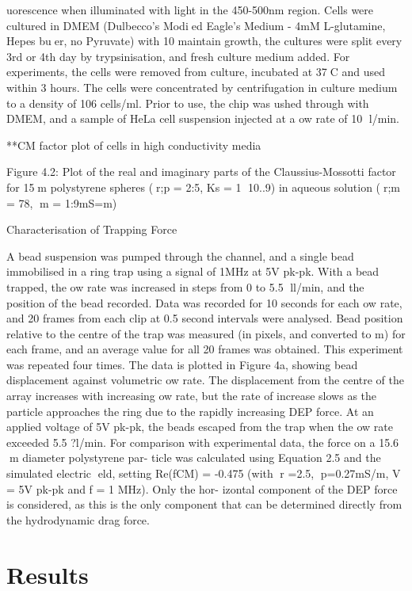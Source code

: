 uorescence when illuminated with light in the 450-500nm region. Cells were cultured
in DMEM (Dulbecco's Modied Eagle's Medium - 4mM L-glutamine, Hepes buer, no
Pyruvate) with 10%
maintain growth, the cultures were split every 3rd or 4th day by trypsinisation, and fresh
culture medium added. For experiments, the cells were removed from culture, incubated
at 37C and used within 3 hours. The cells were concentrated by centrifugation in culture
medium to a density of 106 cells/ml. Prior to use, the chip was 
ushed through with
DMEM, and a sample of HeLa cell suspension injected at a 
ow rate of 10 l/min.


**CM factor plot of cells in high conductivity media

Figure 4.2: Plot of the real and imaginary parts of the Claussius-Mossotti factor for
15m polystyrene spheres (r;p = 2:5, Ks = 1  10..9) in aqueous solution (r;m = 78,
m = 1:9mS=m)

Characterisation of Trapping Force

A bead suspension was pumped through the channel, and a single bead immobilised in
a ring trap using a signal of 1MHz at 5V pk-pk. With a bead trapped, the 
ow rate
was increased in steps from 0 to 5.5 ll/min, and the position of the bead recorded.
Data was recorded for 10 seconds for each 
ow rate, and 20 frames from each clip at
0.5 second intervals were analysed. Bead position relative to the centre of the trap was
measured (in pixels, and converted to m) for each frame, and an average value for all 20
frames was obtained. This experiment was repeated four times. The data is plotted in
Figure 4a, showing bead displacement against volumetric 
ow rate. The displacement
from the centre of the array increases with increasing 
ow rate, but the rate of increase
slows as the particle approaches the ring due to the rapidly increasing DEP force. At
an applied voltage of 5V pk-pk, the beads escaped from the trap when the 
ow rate
exceeded 5.5 ?l/min.
For comparison with experimental data, the force on a 15.6 m diameter polystyrene par-
ticle was calculated using Equation 2.5 and the simulated electric eld, setting Re(fCM)
= -0.475 (with r =2.5, p=0.27mS/m, V = 5V pk-pk and f = 1 MHz). Only the hor-
izontal component of the DEP force is considered, as this is the only component that
can be determined directly from the hydrodynamic drag force.

\section{Results}

